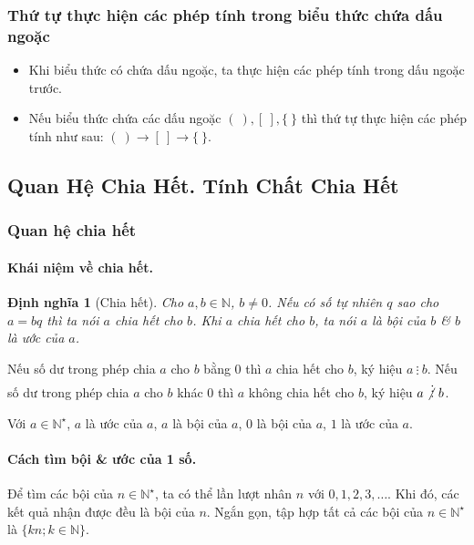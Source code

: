 \documentclass{article}
\numberwithin{equation}{section}
\newtheorem{definition}{Định nghĩa}[section]
\begin{document}
\subsubsection{Thứ tự thực hiện các phép tính trong biểu thức chứa dấu ngoặc}
\begin{tcolorbox}
	\begin{itemize}
		\item Khi biểu thức có chứa dấu ngoặc, ta thực hiện các phép tính trong dấu ngoặc trước.
		\item Nếu biểu thức chứa các dấu ngoặc $(\ ),[\ ],\{\ \}$ thì thứ tự thực hiện các phép tính như sau: $(\ )\to[\ ]\to\{\ \}$.
	\end{itemize}	
\end{tcolorbox}

\subsection{Quan Hệ Chia Hết. Tính Chất Chia Hết}

\subsubsection{Quan hệ chia hết}

\paragraph{Khái niệm về chia hết.}
\begin{definition}[Chia hết]
	Cho $a,b\in\mathbb{N}$, $b\ne 0$. Nếu có số tự nhiên $q$ sao cho $a = bq$ thì ta nói \emph{$a$ chia hết cho $b$}. Khi $a$ chia hết cho $b$, ta nói $a$ là \emph{bội} của $b$ \& $b$ là \emph{ước} của $a$.
\end{definition}
Nếu số dư trong phép chia $a$ cho $b$ bằng 0 thì $a$ chia hết cho $b$, ký hiệu $a\ \vdots\ b$. Nếu số dư trong phép chia $a$ cho $b$ khác 0 thì $a$ không chia hết cho $b$, ký hiệu $a\not\vdots\ b$.

Với $a\in\mathbb{N}^\star$, $a$ là ước của $a$, $a$ là bội của $a$, 0 là bội của $a$, $1$ là ước của $a$.

\paragraph{Cách tìm bội \& ước của 1 số.} Để tìm các bội của $n\in\mathbb{N}^\star$, ta có thể lần lượt nhân $n$ với $0,1,2,3,\ldots$. Khi đó, các kết quả nhận được đều là bội của $n$. Ngắn gọn, tập hợp tất cả các bội của $n\in\mathbb{N}^\star$ là $\{kn;k\in\mathbb{N}\}$.
\end{document}
